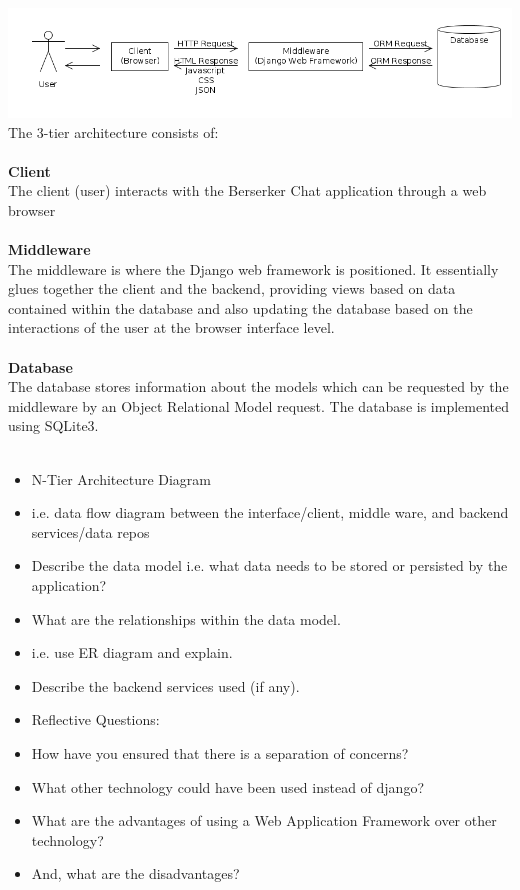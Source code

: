 \documentclass{sig-alt-release2}
\begin{document}
\includegraphics[scale=0.3]{n-tier-arch.png}
The 3-tier architecture consists of: \\\\ 
\textbf{Client} \\
The client (user) interacts with the Berserker Chat application through a web browser\\ \\
\textbf{Middleware} \\
The middleware is where the Django web framework is positioned. It essentially glues together the client and the backend, providing views based on data contained within the database and also updating the database based on the interactions of the user at the browser interface level.\\ \\
\textbf{Database} \\
The database stores information about the models which can be requested by the middleware by an Object Relational Model request. The database is implemented using SQLite3.\\ \\

\begin{itemize}
\item	N-Tier Architecture Diagram %
\item	i.e. data flow diagram between the interface/client, middle ware, and backend services/data repos %
\item	Describe the data model i.e. what data needs to be stored or persisted by the application? %
\item	What are the relationships within the data model. %
\item	i.e. use ER diagram and explain. %
\item	Describe the backend services used (if any). %
\item	Reflective Questions: 
\item	How have you ensured that there is a separation of concerns? %
\item	What other technology could have been used instead of django? %
\item	What are the advantages of using a Web Application Framework over other technology? %
\item	And, what are the disadvantages? %
\end{itemize}
\end{document}
